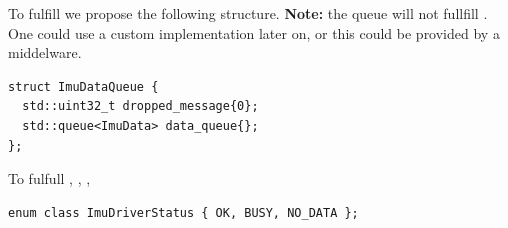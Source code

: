 To fulfill  we propose the following structure.
\textbf{Note:} the queue will not fullfill . One could use a custom implementation later on, or this could be provided by a middelware.
\begin{lstlisting}[style=cppstyle]
struct ImuDataQueue {
  std::uint32_t dropped_message{0};
  std::queue<ImuData> data_queue{};
};
\end{lstlisting}

To fulfull , , ,
\begin{lstlisting}[style=cppstyle]
enum class ImuDriverStatus { OK, BUSY, NO_DATA };
\end{lstlisting}
